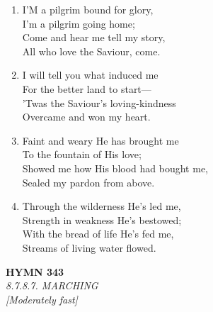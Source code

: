 \documentclass[11pt,a4paper]{article}
\begin{document}
\begin{enumerate}
    \item I'M a pilgrim bound for glory, \\
        I'm a pilgrim going home; \\
        Come and hear me tell my story, \\
        All who love the Saviour, come.

    \item I will tell you what induced me \\
        For the better land to start--- \\
        'Twas the Saviour's loving-kindness \\
        Overcame and won my heart.

    \item Faint and weary He has brought me \\
        To the fountain of His love; \\
        Showed me how His blood had bought me, \\
        Sealed my pardon from above.

    \item Through the wilderness He's led me, \\
        Strength in weakness He's bestowed; \\
        With the bread of life He's fed me, \\
        Streams of living water flowed.

\end{enumerate}

\newpage
\begin{center}
    {\Large \textbf{HYMN 343}}
    \\
    \textit{8.7.8.7. MARCHING}
    \\
    \textit{\small [Moderately fast]}
\end{center}
\vspace{1em}
\end{document}
